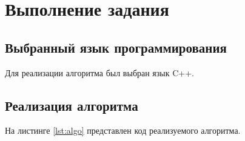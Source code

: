 \chapter{Выполнение задания}

\section{Выбранный язык программирования}

Для реализации алгоритма был выбран язык C++.

\section{Реализация алгоритма}

На листинге \ref{lst:algo} представлен код реализуемого алгоритма.

